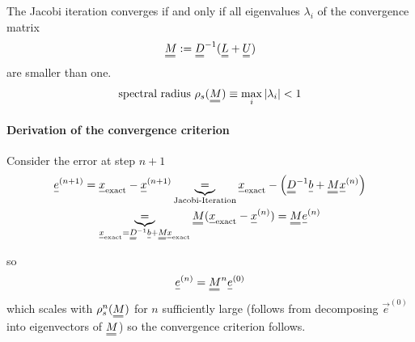 The Jacobi iteration converges if and only if all eigenvalues $\lambda_i$ of the convergence
matrix
\begin{equation}
    \mat{M} := \mat{D}^{-1} (\mat{L} + \mat{U})
\end{equation}
are smaller than one.
\begin{equation}
    \text{spectral radius } \rho_s(\mat{M}) \equiv \max_i{|\lambda_i|} < 1
\end{equation}
\paragraph{Derivation of the convergence criterion}
Consider the error at step $n+1$
\begin{equation}
    \begin{gathered}
        \vec{e}^{(n+1)} = \vec{x}_{\text{exact}} - \vec{x}^{(n+1)} \underbrace{=}_{\text{Jacobi-Iteration}} \vec{x}_{\text{exact}} - \left( \mat{D}^{-1} \vec{b} + \mat{M} \vec{x}^{(n)} \right) \\
    \underbrace{=}_{\vec{x}_{\text{exact}} = \mat{D}^{-1}\vec{b}+\mat{M}\vec{x}_{\text{exact}}} \mat{M} (\vec{x}_{\text{exact}} - \vec{x}^{(n)}) = \mat{M} \vec{e}^{(n)}
    \end{gathered}
\end{equation}

so
\begin{equation}
    \vec{e}^{(n)} = \mat{M}^n \vec{e}^{(0)}
\end{equation}
which scales with $\rho_s^n(\mat{M})$ for $n$ sufficiently large (follows from decomposing $\vec{e}^{(0)}$ into eigenvectors of $\mat{M}$)
so the convergence criterion follows.



